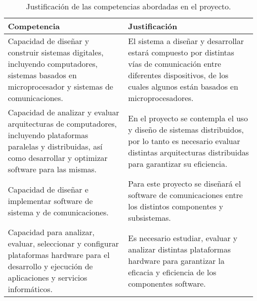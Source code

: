 \begin{table}[h]
    \centering
    \def\tablename{Tabla}
    \caption{Justificación de las competencias abordadas en el proyecto.}
    \vspace{0.5em}
    \begin{tabular}{ | p{8cm} | p{8cm} | }
        \hline
        {\bfseries Competencia} & {\bfseries Justificación} \\ \hline\hline
        Capacidad de diseñar y construir sistemas digitales, incluyendo computadores, sistemas basados en microprocesador y sistemas de comunicaciones.
        &
        El sistema a diseñar y desarrollar estará compuesto por distintas vías de comunicación entre diferentes dispositivos, de los cuales algunos están basados en microprocesadores.
        \\ \hline
        Capacidad de analizar y evaluar arquitecturas de computadores, incluyendo plataformas paralelas y distribuidas, así como desarrollar y optimizar software para las mismas.
        &
        En el proyecto se contempla el uso y diseño de sistemas distribuidos, por lo tanto es necesario evaluar distintas arquitecturas distribuidas para garantizar su eficiencia.
        \\ \hline
        Capacidad de diseñar e implementar software de sistema y de comunicaciones.
        &
        Para este proyecto se diseñará el software de comunicaciones entre los distintos componentes y subsistemas.
        \\ \hline
        Capacidad para analizar, evaluar, seleccionar y configurar plataformas hardware para el desarrollo y ejecución de aplicaciones y servicios informáticos.
        &
        Es necesario estudiar, evaluar y analizar distintas plataformas hardware para garantizar la eficacia y eficiencia de los componentes software.
        \\ \hline
    \end{tabular}
    \label{tab:competencias}
\end{table}